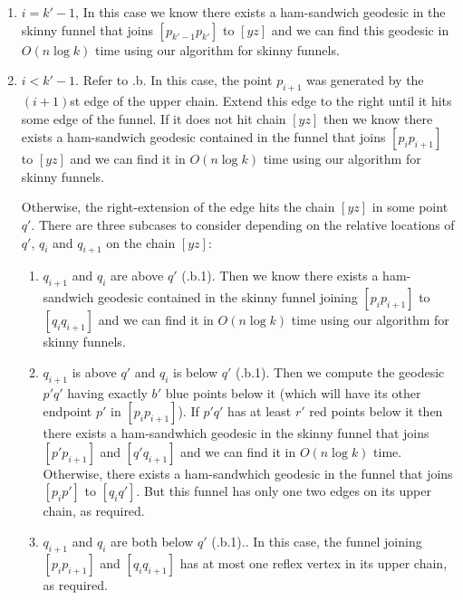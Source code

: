 \documentclass[charterfonts,lotsofwhite]{patmorin}
\newcommand{\chain}[2]{[#1#2]}
\begin{document}
\begin{enumerate}

\item $i=k'-1$, In this case we know there exists a ham-sandwich
geodesic in the skinny funnel that joins $\chain{p_{k'-1}}{p_{k'}}$ to
$\chain{y}{z}$ and we can find this geodesic in $O(n\log k)$ time using
our algorithm for skinny funnels.

\item $i < k'-1$.  Refer to .b. In this case, the
point $p_{i+1}$ was generated by the $(i+1)$st edge of the upper chain.
Extend this edge to the right until it hits some edge of the funnel.
If it does not hit chain $\chain{y}{z}$ then we know there exists a
ham-sandwich geodesic contained in the funnel that joins
$\chain{p_{i}}{p_{i+1}}$ to $\chain{y}{z}$ and we can find it in $O(n\log
k)$ time using our algorithm for skinny funnels.  

Otherwise, the right-extension of the edge hits the chain
$\chain{y}{z}$ in some point $q'$.  There are three subcases to
consider depending on the relative locations of $q'$, $q_i$ and
$q_{i+1}$ on the chain $\chain{y}{z}$:

\begin{enumerate}

\item $q_{i+1}$ and $q_i$ are above $q'$
(.b.1).  Then we know there exists
a ham-sandwich geodesic contained in the skinny funnel joining
$\chain{p_i}{p_{i+1}}$ to $\chain{q_i}{q_{i+1}}$ and we can find it in $O(
n\log k)$ time using our algorithm for skinny funnels.

\item $q_{i+1}$ is above $q'$ and $q_i$ is below $q'$
(.b.1).  Then we compute the geodesic $p'q'$
having exactly $b'$ blue points below it (which will have its other
endpoint $p'$ in $\chain{p_{i}}{p_{i+1}}$).  If $p'q'$ has at least
$r'$ red points below it then there exists a ham-sandwhich geodesic in
the skinny funnel that joins $\chain{p'}{p_{i+1}}$ and
$\chain{q'}{q_{i+1}}$ and we can find it in $O(n\log k)$ time.
Otherwise, there exists a ham-sandwhich geodesic in the funnel that
joins $\chain{p_i}{p'}$ to $\chain{q_i}{q'}$.  But this funnel has
only one two edges on its upper chain, as required.

\item $q_{i+1}$ and $q_{i}$ are both below $q'$
(.b.1)..  In this case, the funnel joining
$\chain{p_i}{p_{i+1}}$ and $\chain{q_i}{q_{i+1}}$ has at most one reflex
vertex in its upper chain, as required.
\end{enumerate}

\end{enumerate}
\end{document}
